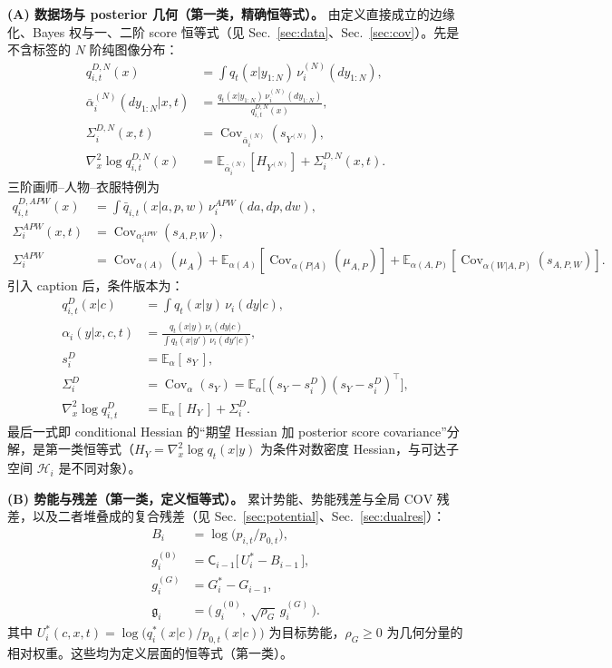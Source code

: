 \documentclass[11pt,a4paper]{article}
\DeclareMathOperator{\Cov}{Cov}
\newcommand{\E}{\mathbb{E}}
\newcommand{\cH}{\mathcal{H}}   %
\newcommand{\Center}{\mathsf{C}}    %
\newcommand{\COV}{\mathrm{COV}}     %
\newcommand{\gres}{\bm{\mathfrak{g}}} %
\begin{document}
\medskip
\noindent\textbf{(A) 数据场与 posterior 几何（第一类，精确恒等式）。}
由定义直接成立的边缘化、Bayes 权与一、二阶 score 恒等式（见 Sec.~\ref{sec:data}、Sec.~\ref{sec:cov}）。先是不含标签的 $N$ 阶纯图像分布：
\begin{align*}
q_{i,t}^{D,N}(x)
&= \int q_t(x|y_{1:N})\,\nu_i^{(N)}(dy_{1:N}), \\
\bar\alpha_i^{(N)}(dy_{1:N}|x,t)
&=
\frac{q_t(x|y_{1:N})\,\nu_i^{(N)}(dy_{1:N})}{q_{i,t}^{D,N}(x)}, \\
\Sigma_i^{D,N}(x,t)
&=\Cov_{\bar\alpha_i^{(N)}}(s_{Y^{(N)}}), \\
\nabla_x^2\log q_{i,t}^{D,N}(x)
&=\E_{\bar\alpha_i^{(N)}}[H_{Y^{(N)}}]+\Sigma_i^{D,N}(x,t).
\end{align*}
三阶画师--人物--衣服特例为
\begin{align*}
q_{i,t}^{D,APW}(x)
&=
\int \bar q_{i,t}(x|a,p,w)\,\nu_i^{APW}(da,dp,dw),\\
\Sigma_i^{APW}(x,t)
&=\Cov_{\alpha_i^{APW}}(s_{A,P,W}),\\
\Sigma_i^{APW}
&=
\Cov_{\alpha(A)}(\mu_A)
+\E_{\alpha(A)}[\Cov_{\alpha(P|A)}(\mu_{A,P})]
+\E_{\alpha(A,P)}[\Cov_{\alpha(W|A,P)}(s_{A,P,W})].
\end{align*}
引入 caption 后，条件版本为：
\begin{align*}
q_{i,t}^D(x|c) &= \int q_t(x|y)\,\nu_i(dy|c), \\
\alpha_i(y|x,c,t) &= \frac{q_t(x|y)\,\nu_i(dy|c)}{\int q_t(x|y')\,\nu_i(dy'|c)}, \\
s_i^D &= \E_{\alpha}[\,s_Y\,], \\
\Sigma_i^D &= \Cov_{\alpha}(s_Y)=\E_{\alpha}\!\big[(s_Y-s_i^D)(s_Y-s_i^D)^\top\big], \\
\nabla_x^2 \log q_{i,t}^D &= \E_{\alpha}[\,H_Y\,]+\Sigma_i^D .
\end{align*}
最后一式即 conditional Hessian 的“期望 Hessian 加 posterior score covariance”分解，是第一类恒等式（$H_Y=\nabla_x^2\log q_t(x|y)$ 为条件对数密度 Hessian，与可达子空间 $\cH_i$ 是不同对象）。

\medskip
\noindent\textbf{(B) 势能与残差（第一类，定义恒等式）。}
累计势能、势能残差与全局 $\COV$ 残差，以及二者堆叠成的复合残差（见 Sec.~\ref{sec:potential}、Sec.~\ref{sec:dualres}）：
\begin{align*}
B_i &= \log\!\big(p_{i,t}/p_{0,t}\big), \\
g_i^{(0)} &= \Center_{i-1}\!\big[\,U_i^*-B_{i-1}\,\big], \\
g_i^{(G)} &= G_i^*-G_{i-1}, \\
\gres_i &= \big(\,g_i^{(0)},\ \sqrt{\rho_G}\,g_i^{(G)}\,\big).
\end{align*}
其中 $U_i^*(c,x,t)=\log\!\big(q_i^*(x|c)/p_{0,t}(x|c)\big)$ 为目标势能，$\rho_G\ge0$ 为几何分量的相对权重。这些均为定义层面的恒等式（第一类）。
\end{document}
